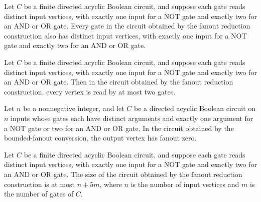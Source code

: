 \begin{theorem}
\label{BoolCircuit.DAGCircuit.fanoutTwoNN_strict}
\leanok
{}
Let $C$ be a finite directed acyclic Boolean circuit, and suppose each gate reads
distinct input vertices, with exactly one input for a NOT gate and exactly two for an
AND or OR gate. Every gate in the circuit obtained by the fanout reduction construction
also has distinct input vertices, with exactly one input for a NOT gate and exactly two
for an AND or OR gate.
\end{theorem}

\begin{theorem}
\label{BoolCircuit.DAGCircuit.fanoutTwoNN_hasFanoutTwo}
\leanok
{}
Let $C$ be a finite directed acyclic Boolean circuit, and suppose each gate reads
distinct input vertices, with exactly one input for a NOT gate and exactly two for an
AND or OR gate. Then in the circuit obtained by the fanout reduction construction, every
vertex is read by at most two gates.
\end{theorem}

\begin{theorem}
\label{BoolCircuit.DAGCircuit.fanoutTwoNN_fanout_output}
\leanok
{}
Let $n$ be a nonnegative integer, and let $C$ be a directed acyclic Boolean circuit on
$n$ inputs whose gates each have distinct arguments and exactly one argument for a NOT
gate or two for an AND or OR gate. In the circuit obtained by the bounded-fanout
conversion, the output vertex has fanout zero.
\end{theorem}

\begin{theorem}
\label{BoolCircuit.DAGCircuit.fanoutTwoNN_size_le}
\leanok
{}
Let $C$ be a finite directed acyclic Boolean circuit, and suppose each gate reads
distinct input vertices, with exactly one input for a NOT gate and exactly two for an
AND or OR gate. The size of the circuit obtained by the fanout reduction construction is
at most $n+5m$, where $n$ is the number of input vertices and $m$ is the number of gates
of $C$.
\end{theorem}

